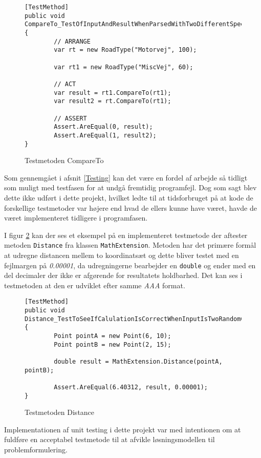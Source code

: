 \begin{figure}[H]
\begin{lstlisting}
[TestMethod]
public void 
CompareTo_TestOfInputAndResultWhenParsedWithTwoDifferentSpeedValues()
{
		// ARRANGE
		var rt = new RoadType("Motorvej", 100);
           
		var rt1 = new RoadType("MiscVej", 60);

		// ACT
		var result = rt1.CompareTo(rt1);
		var result2 = rt.CompareTo(rt1);

		// ASSERT    
		Assert.AreEqual(0, result);
		Assert.AreEqual(1, result2);
}
\end{lstlisting}
\caption{Testmetoden CompareTo}\label{comparetotestmetode}
\end{figure}

Som gennemgået i afsnit \ref{Testing} kan det være en fordel af arbejde så tidligt som muligt med testfasen for at undgå fremtidig programfejl. Dog som sagt blev dette ikke udført i dette projekt, hvilket ledte til at tidsforbruget på at kode de forskellige testmetoder var højere end hvad de ellers kunne have været, havde de været implementeret tidligere i programfasen.

\vspace{5mm}

I figur \ref{DistanceTestMethod} kan der ses et eksempel på en implementeret testmetode der aftester metoden \texttt{Distance} fra klassen \texttt{MathExtension}. Metoden har det primære formål at udregne distancen mellem to koordinatsæt og dette bliver testet med en fejlmargen på \textit{0.00001}, da udregningerne bearbejder en \texttt{double} og ender med en del decimaler der ikke er afgørende for resultatets holdbarhed. Det kan ses i testmetoden at den er udviklet efter samme \textit{AAA} format.

\begin{figure}[H]
\begin{lstlisting}
[TestMethod]
public void 
Distance_TestToSeeIfCalulationIsCorrectWhenInputIsTwoRandomCoords()
{
		Point pointA = new Point(6, 10);
		Point pointB = new Point(2, 15);

        double result = MathExtension.Distance(pointA, pointB);

        Assert.AreEqual(6.40312, result, 0.00001);
}
\end{lstlisting}
\caption{Testmetoden Distance}\label{DistanceTestMethod}
\end{figure}

Implementationen af unit testing i dette projekt var med intentionen om at fuldføre en acceptabel testmetode til at afvikle løsningsmodellen til problemformulering.
